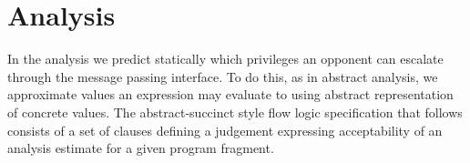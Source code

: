 \begin{comment}
\paragraph{Permission bundling analysis.}\todo{outdated example. still useful for next project.}
Identifying dangerous permission bundling is challenging, since it depends on the structure of the exchanged messages. For instance, if both $CS1$ and $CS2$ employ the same tags, then the handler $B$ is not bundled at all and must be accepted. We associate to each handler a set of incoming messages and a set of outgoing messages, as follows:
\begin{verbatim}
cs1: (emptyset, b <- {tag: "Message1"})
cs2: (emptyset, b <- {tag: "Message2"})
b:   ({{tag: "Message1"}, {tag: "Message2"}}, emptyset)
\end{verbatim}
This is what is represented in the \emph{abstract networks} which we introduce below, even though the real structure of the abstract networks is slightly more complicated than this to make the static analysis more precise.

Based on this information, we understand that we can refactor the code as follows:
\begin{verbatim}
cs1(x <| top).send(b1,{tag: "Message1"} |> B) with CS1
cs2(x <| top).send(b2,{tag: "Message2"} |> B) with CS2
b1(x <| CS1).if (x[tag] == "Message1") then >> rho else >> rho' with B
b2(x <| CS2).if (x[tag] == "Message1") then >> rho else >> rho' with B
\end{verbatim}
For the opponent-aware analysis, this code is exactly as dangerous as the old one, since compromised components can just ignore tags (which indeed do not provide any security guarantee). Still, we can reuse our flow analysis to eliminate dead code:
\begin{verbatim}
cs1(x <| top).send(b1,{tag: "Message1"} |> B) with CS1
cs2(x <| top).send(b,{tag: "Message2"} |> B) with CS2
b1(x <| CS1).>> rho with B
b2(x <| CS2).>> rho' with B
\end{verbatim}
Now the opponent-aware analysis shows a different surface for privilege escalation. Specifically, a caller with $CS1$ can escalate to $\rho$, while a caller with $CS2$ can escalate to $\rho'$, which is much better than before.
\end{comment}

\section{Analysis}
\label{sec:Analysis}
In the analysis we predict statically which privileges an opponent can escalate through the message passing interface. To do this, as in abstract analysis, we approximate values an expression may evaluate to using abstract representation of concrete values.
The abstract-succinct style flow logic specification that follows consists of a set of clauses defining a judgement expressing acceptability of an analysis estimate for a given program fragment.

